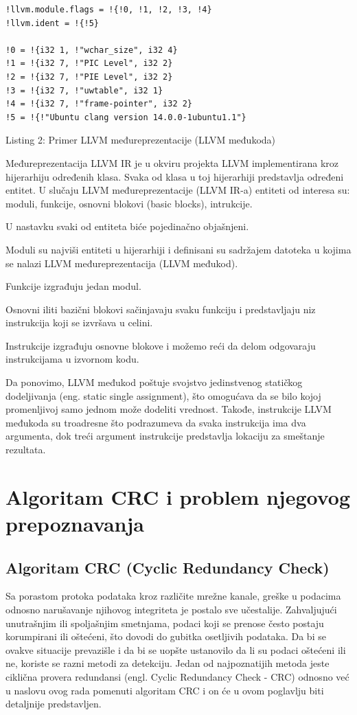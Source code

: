 \documentclass[12pt,oneside]{memoir}
\begin{document}
\begin{listing}
\begin{verbatim}
!llvm.module.flags = !{!0, !1, !2, !3, !4}
!llvm.ident = !{!5}

!0 = !{i32 1, !"wchar_size", i32 4}
!1 = !{i32 7, !"PIC Level", i32 2}
!2 = !{i32 7, !"PIE Level", i32 2}
!3 = !{i32 7, !"uwtable", i32 1}
!4 = !{i32 7, !"frame-pointer", i32 2}
!5 = !{!"Ubuntu clang version 14.0.0-1ubuntu1.1"}
\end{verbatim}
\caption{Listing 2: Primer LLVM međureprezentacije (LLVM međukoda)}
\label{lst:llvm_compile_commands}
\end{listing}

Međureprezentacija LLVM IR je u okviru projekta LLVM implementirana kroz hijerarhiju određenih 
klasa. Svaka od klasa u toj hijerarhiji predstavlja određeni entitet. U slučaju LLVM 
međureprezentacije (LLVM IR-a) entiteti od interesa su: moduli, funkcije, osnovni blokovi (basic 
blocks), intrukcije.

U nastavku svaki od entiteta biće pojedinačno objašnjeni.

Moduli su najviši entiteti u hijerarhiji i definisani su sadržajem datoteka u kojima se nalazi LLVM međureprezentacija (LLVM međukod).

Funkcije izgrađuju jedan modul.

Osnovni iliti bazični blokovi sačinjavaju svaku funkciju i predstavljaju niz instrukcija koji se izvršava u celini.

Instrukcije izgrađuju osnovne blokove i možemo reći da delom odgovaraju instrukcijama u izvornom 
kodu.

Da ponovimo, LLVM međukod poštuje svojstvo jedinstvenog statičkog dodeljivanja 
(eng. static single assignment), što omogućava da se bilo kojoj promenljivoj 
samo jednom može dodeliti vrednost. Takođe, instrukcije LLVM međukoda su 
troadresne što podrazumeva da svaka instrukcija ima dva argumenta, dok treći 
argument instrukcije predstavlja lokaciju za smeštanje rezultata. 

\chapter{Algoritam CRC i problem njegovog prepoznavanja}
\section{Algoritam CRC (Cyclic Redundancy Check)}
Sa porastom protoka podataka kroz različite mrežne kanale, greške u podacima odnosno narušavanje 
njihovog integriteta je postalo sve učestalije. Zahvaljujući unutrašnjim ili spoljašnjim 
smetnjama, podaci koji se prenose često postaju korumpirani ili oštećeni, što dovodi do gubitka 
osetljivih podataka. Da bi se ovakve situacije prevazišle i da bi se uopšte ustanovilo da li su 
podaci oštećeni ili ne, koriste se razni metodi za detekciju. Jedan od najpoznatijih metoda jeste 
ciklična provera redundansi (engl. Cyclic Redundancy Check - CRC) odnosno već u naslovu ovog rada 
pomenuti algoritam CRC i on će u ovom poglavlju biti detaljnije predstavljen.
\end{document}
